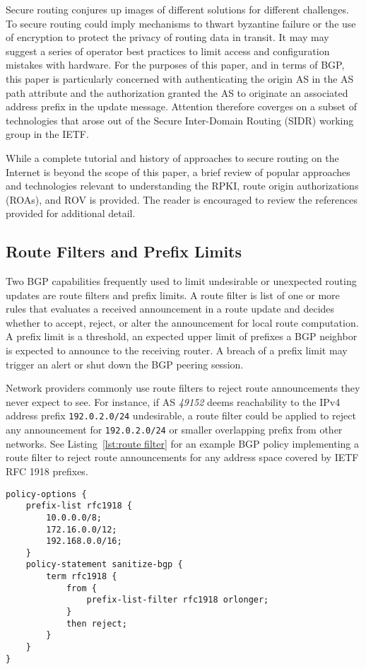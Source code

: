 \documentclass[sigconf]{acmart}
\begin{document}
Secure routing conjures up images of different solutions for different
challenges.  To secure routing could imply mechanisms to thwart
byzantine failure or the use of encryption to protect the privacy of
routing data in transit.  It may may suggest a series of operator best
practices to limit access and configuration mistakes with hardware.  For
the purposes of this paper, and in terms of BGP, this paper is
particularly concerned with authenticating the origin AS in the AS path
attribute and the authorization granted the AS to originate an
associated address prefix in the update message.  Attention therefore
coverges on a subset of technologies that arose out of the Secure
Inter-Domain Routing (SIDR) working group in the IETF.

While a complete tutorial and history of approaches to secure routing on
the Internet is beyond the scope of this paper, a brief review of
popular approaches and technologies relevant to understanding the RPKI,
route origin authorizations (ROAs), and ROV is provided.  The reader is
encouraged to review the references provided for additional detail.

\subsection{Route Filters and Prefix Limits}

Two BGP capabilities frequently used to limit undesirable or unexpected
routing updates are route filters and prefix limits.  A route filter is
list of one or more rules that evaluates a received announcement in a
route update and decides whether to accept, reject, or alter the
announcement for local route computation.  A prefix limit is a
threshold, an expected upper limit of prefixes a BGP neighbor is
expected to announce to the receiving router.  A breach of a prefix
limit may trigger an alert or shut down the BGP peering session.

Network providers commonly use route filters to reject route
announcements they never expect to see.  For instance, if AS
\emph{49152} deems reachability to the IPv4 address prefix
\texttt{192.0.2.0/24} undesirable, a route filter could be applied to
reject any announcement for \texttt{192.0.2.0/24} or smaller overlapping
prefix from other networks.  See Listing~\ref{lst:route filter} for an
example BGP policy implementing a route filter to reject route
announcements for any address space covered by IETF RFC 1918
prefixes.\cite{moskowitz_address_1996}

\begin{lstlisting}[float,basicstyle=\footnotesize\ttfamily,caption={Example Junos route filter},label={lst:route filter}]
policy-options {
    prefix-list rfc1918 {
        10.0.0.0/8;                         
        172.16.0.0/12;                      
        192.168.0.0/16;                     
    }
    policy-statement sanitize-bgp {
        term rfc1918 {
            from {
                prefix-list-filter rfc1918 orlonger;
            }
            then reject;
        }
    }
}
\end{lstlisting}
\end{document}
